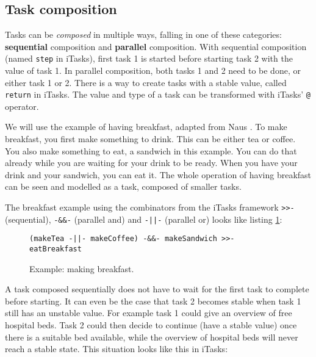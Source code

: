 \subsection{Task composition}\label{section-top-composition}
Tasks can be \textit{composed} in multiple ways, falling in one of these categories: \textbf{sequential} composition and \textbf{parallel} composition. With sequential composition (named \texttt{step} in iTasks), first task 1 is started before starting task 2 with the value of task 1. In parallel composition, both tasks 1 and 2 need to be done, or either task 1 or 2. There is a way to create tasks with a stable value, called \texttt{return} in iTasks. The value and type of a task can be transformed with iTasks' \texttt{@} operator.

We will use the example of having breakfast, adapted from Naus \cite{naus2020assisting}. To make breakfast, you first make something to drink. This can be either tea or coffee. You also make something to eat, a sandwich in this example. You can do that already while you are waiting for your drink to be ready. When you have your drink and your sandwich, you can eat it. The whole operation of having breakfast can be seen and modelled as a task, composed of smaller tasks.

The breakfast example using the combinators from the iTasks framework \texttt{>>-} (sequential), \texttt{-&&-} (parallel and) and \texttt{-||-} (parallel or) looks like listing \ref{lst:clean_breakfast}:

\begin{figure}[ht]
\centering
\begin{verbatim}
(makeTea -||- makeCoffee) -&&- makeSandwich >>- eatBreakfast
\end{verbatim}
\caption{Example: making breakfast.}
\label{lst:clean_breakfast}
\end{figure}



A task composed sequentially does not have to wait for the first task to complete before starting. It can even be the case that task 2 becomes stable when task 1 still has an unstable value. For example task 1 could give an overview of free hospital beds. Task 2 could then decide to continue (have a stable value) once there is a suitable bed available, while the overview of hospital beds will never reach a stable state. This situation looks like this in iTasks:

